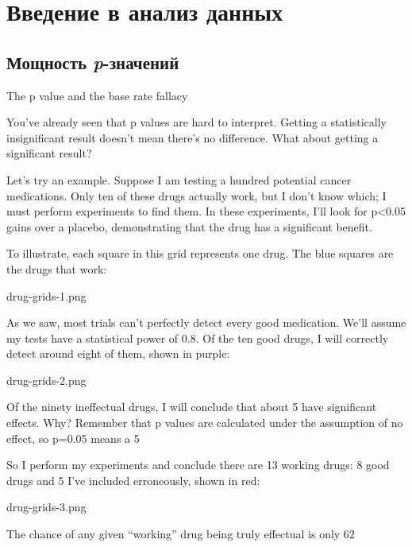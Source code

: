 \chapter{Введение в анализ данных}
\label{chp5}

\section{Мощность \emph{p}-значений}
\label{chp5: }

The p value and the base rate fallacy

You’ve already seen that p values are hard to interpret. Getting a statistically insignificant result doesn’t mean there’s no difference. What about getting a significant result?

Let’s try an example. Suppose I am testing a hundred potential cancer medications. Only ten of these drugs actually work, but I don’t know which; I must perform experiments to find them. In these experiments, I’ll look for p<0.05 gains over a placebo, demonstrating that the drug has a significant benefit.

To illustrate, each square in this grid represents one drug. The blue squares are the drugs that work:

drug-grids-1.png

As we saw, most trials can’t perfectly detect every good medication. We’ll assume my tests have a statistical power of 0.8. Of the ten good drugs, I will correctly detect around eight of them, shown in purple:

drug-grids-2.png

Of the ninety ineffectual drugs, I will conclude that about 5 have significant effects. Why? Remember that p values are calculated under the assumption of no effect, so p=0.05 means a 5%

So I perform my experiments and conclude there are 13 working drugs: 8 good drugs and 5 I’ve included erroneously, shown in red:

drug-grids-3.png


The chance of any given “working” drug being truly effectual is only 62%

